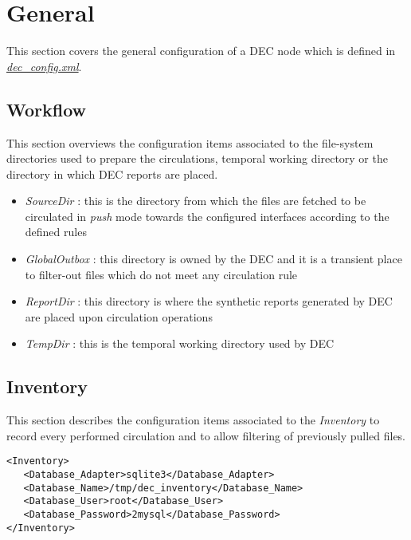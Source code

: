 \documentclass[dec_sum_main.tex]{subfiles}
\begin{document}
\section{General}

This section covers the general configuration of a DEC node which is defined in \hyperref[decconfigxml]{\textit{dec\_config.xml}}. 


\subsection{Workflow}
This section overviews the configuration items associated to the file-system directories used to prepare the circulations, temporal working directory or the directory in which DEC reports are placed.

\begin{itemize}
	\label{SourceDir}
	\item \textit{SourceDir} : this is the directory from which the files are fetched to be circulated in \textit{push} mode towards the configured interfaces according to the defined rules
	\label{GlobalOutbox}
	\item \textit{GlobalOutbox} : this directory is owned by the DEC and it is a transient place to filter-out files which do not meet any circulation rule
	\label{ReportDir}
	\item \textit{ReportDir}  : this directory is where the synthetic reports generated by DEC are placed upon circulation operations
	\label{TempDir}
	\item \textit{TempDir} : this is the temporal working directory used by DEC
\end{itemize}


\label{Inventory}
\subsection{Inventory}
This section describes the configuration items associated to the \textit{Inventory} to record every performed circulation and to allow filtering of previously pulled files.

\begin{verbatim}
<Inventory>
   <Database_Adapter>sqlite3</Database_Adapter>
   <Database_Name>/tmp/dec_inventory</Database_Name>
   <Database_User>root</Database_User>
   <Database_Password>2mysql</Database_Password>
</Inventory>
\end{verbatim}
\end{document}
